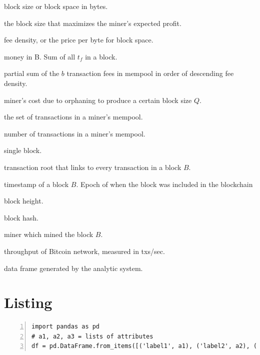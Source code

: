 \documentclass[USenglish]{uit-thesis}
\def\bitcoin{\leavevmode\rlap{\hskip.5pt-}B}
\begin{document}
\begin{appendices}
\begin{description}[leftmargin=!, labelwidth=\widthof{\bfseries $M_{demand}(b)$ }]
	\item [$Q$] block size or block space in bytes.
	\item [$Q^*$] the block size that maximizes the miner’s expected profit.
	\item [$\rho$] fee density, or the price per byte for block space.
	\item [$M$] money in \bitcoin. Sum of all $t_f$ in a block.
	\item [$M_{demand}(b)$] partial sum of the $b$ transaction fees
	in mempool in order of descending fee density.
	\item [$M_{supply}(Q)$] miner’s cost due to orphaning to produce a certain block size $Q$.
	\item [$\mathcal{N}$] the set of transactions in a miner’s mempool.
	\item [$n$] number of transactions in a miner’s mempool.
	\item [$B$] single block.
	\item [$B_t$] transaction root that links to every transaction in a block $B$.
	\item [$B_{epoch}$] timestamp of a block $B$.
	Epoch of when the block was included in the blockchain
	\item [$B_h$] block height.
	\item [$B_{ha}$] block hash.
	\item [$B_{mi}$] miner which mined the block $B$.
	\item [$\gamma$] throughput of Bitcoin network, measured in txs/sec.
	\item [$D$] data frame generated by the analytic system.
\end{description}

\chapter{Listing}
\label{app:listing}
	
\begin{lstlisting}[numbers=left,frame=single,caption={Creation of Pandas data frame}]
import pandas as pd
# a1, a2, a3 = lists of attributes
df = pd.DataFrame.from_items([('label1', a1), ('label2', a2), ('label3', a3)])
\end{lstlisting}


\end{appendices}
\end{document}
